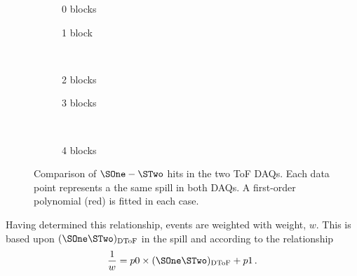 \begin{figure}[t]
  \begin{subfigure}[t]{.5\textwidth}
    \begin{adjustbox}{max totalsize=\textwidth, center}
      
    \end{adjustbox}
    \caption{0 blocks}
  \end{subfigure}
  \hfill
  \begin{subfigure}[t]{.5\textwidth}
    \begin{adjustbox}{max totalsize=\textwidth, center}
            
    \end{adjustbox}
    \caption{1 block}
  \end{subfigure} \\
  \begin{subfigure}[t]{.5\textwidth}
    \begin{adjustbox}{max totalsize=\textwidth, center}
      
    \end{adjustbox}
    \caption{2 blocks}
  \end{subfigure}
  \hfill
  \begin{subfigure}[t]{.5\textwidth}
    \begin{adjustbox}{max totalsize=\textwidth, center}
      
    \end{adjustbox}
    \caption{3 blocks}
  \end{subfigure} \\
  \begin{subfigure}[t]{\textwidth}
    \begin{adjustbox}{max totalsize=.5\textwidth, center}
      
    \end{adjustbox}
    \caption{4 blocks}
  \end{subfigure}
  
  \caption[Comparison of $\SOne-\STwo$ hits in the two ToF DAQs]{Comparison of $\SOne-\STwo$ hits in the two ToF DAQs. Each data point represents a the same spill in both DAQs. A first-order polynomial (red) is fitted in each case.}
  \label{fig:s1s2DeadtimeComp}
\end{figure}

Having determined this relationship, \SThree events are weighted with weight, $w$.
This is based upon $(\SOne\STwo)_{\text{DToF}}$ in the spill and according to the relationship
\begin{equation}
  \frac{1}{w} = p0 \times (\SOne\STwo)_{\text{DToF}} + p1 \,.
\end{equation}

